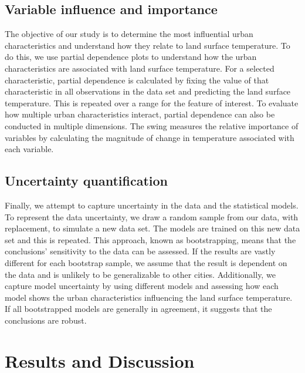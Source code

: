 \documentclass[final,3p,times,onecolumn,sort&compress]{elsarticle}
\begin{document}
\subsection{Variable influence and importance}
The objective of our study is to determine the most influential urban characteristics and understand how they relate to land surface temperature.
To do this, we use partial dependence plots to understand how the urban characteristics are associated with land surface temperature.
For a selected characteristic, partial dependence is calculated by fixing the value of that characteristic in all observations in the data set and predicting the land surface temperature. 
This is repeated over a range for the feature of interest.
To evaluate how multiple urban characteristics interact, partial dependence can also be conducted in multiple dimensions.
The swing \citep{Shortridge2015-ub} measures the relative importance of variables by calculating the magnitude of change in temperature associated with each variable.

\subsection{Uncertainty quantification}
Finally, we attempt to capture uncertainty in the data and the statistical models. 
To represent the data uncertainty, we draw a random sample from our data, with replacement, to simulate a new data set.
The models are trained on this new data set and this is repeated.
This approach, known as bootstrapping, means that the conclusions' sensitivity to the data can be assessed.
If the results are vastly different for each bootstrap sample, we assume that the result is dependent on the data and is unlikely to be generalizable to other cities.
Additionally, we capture model uncertainty by using different models and assessing how each model shows the urban characteristics influencing the land surface temperature.
If all bootstrapped models are generally in agreement, it suggests that the conclusions are robust.


\section{Results and Discussion}
\end{document}
